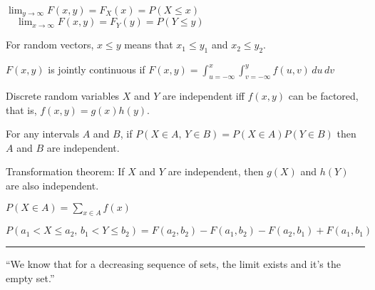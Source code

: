 \documentclass[10pt]{article}
\begin{document}
\begin{plain}
\smallskip
$\lim_{y\to\infty}F(x,y)=F_X(x)=P(X\le x)$
$\quad\lim_{x\to\infty}F(x,y)=F_Y(y)=P(Y\le y)$

\smallskip
For random vectors, $x\le y$ means that
$x_1\le y_1$ and $x_2\le y_2$.

\smallskip
$F(x,y)$ is jointly continuous if
$\displaystyle F(x,y)=\int_{u=-\infty}^x
\int_{v=-\infty}^y f(u,v)\,du\,dv$

\smallskip
Discrete random variables $X$ and $Y$ are independent iff
$f(x,y)$ can be factored, that is,
$f(x,y)=g(x)h(y)$.

\smallskip
For any intervals $A$ and $B$, if
$P(X\in A,\,Y\in B)=P(X\in A)P(Y\in B)$ then $A$ and $B$
are independent.

\smallskip
Transformation theorem:
If $X$ and $Y$ are independent, then $g(X)$ and $h(Y)$ are
also independent.

\smallskip
$\displaystyle P(X\in A)=\sum_{x\in A}f(x)$

\smallskip
$P(a_1<X\le a_2,\,b_1<Y\le b_2)
=F(a_2,b_2)-F(a_1,b_2)-F(a_2,b_1)+F(a_1,b_1)$

\smallskip
\hrule

\smallskip
``We know that for a decreasing sequence of sets, the limit exists
and it's the empty set.''

\end{plain}
\end{document}
